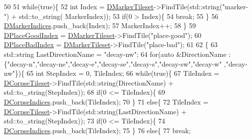 \begin{DoxyCode}
50     
51     \textcolor{keywordflow}{while}(\textcolor{keyword}{true})\{
52         \textcolor{keywordtype}{int} Index = \hyperlink{classCAssetRenderer_afc1e190959f7fd837d6aeb5858cca059}{DMarkerTileset}->FindTile(std::string(\textcolor{stringliteral}{"marker-"}) + std::to\_string(
      MarkerIndex));
53         \textcolor{keywordflow}{if}(0 > Index)\{
54             \textcolor{keywordflow}{break};   
55         \}
56         \hyperlink{classCAssetRenderer_a912a2f38f04bc2e5347f972f8f0caa56}{DMarkerIndices}.push\_back(Index);
57         MarkerIndex++;
58     \}
59     \hyperlink{classCAssetRenderer_a2bf69fa52909e0daccd3b3afc8c79119}{DPlaceGoodIndex} = \hyperlink{classCAssetRenderer_afc1e190959f7fd837d6aeb5858cca059}{DMarkerTileset}->FindTile(\textcolor{stringliteral}{"place-good"});
60     \hyperlink{classCAssetRenderer_a765462ccdeccb81926f565e5d403ed6d}{DPlaceBadIndex} = \hyperlink{classCAssetRenderer_afc1e190959f7fd837d6aeb5858cca059}{DMarkerTileset}->FindTile(\textcolor{stringliteral}{"place-bad"});
61         
62     \{
63         std::string LastDirectionName = \textcolor{stringliteral}{"decay-nw"};
64         \textcolor{keywordflow}{for}(\textcolor{keyword}{auto} &DirectionName : \{\textcolor{stringliteral}{"decay-n"},\textcolor{stringliteral}{"decay-ne"},\textcolor{stringliteral}{"decay-e"},\textcolor{stringliteral}{"decay-se"},\textcolor{stringliteral}{"decay-s"},\textcolor{stringliteral}{"decay-sw"},\textcolor{stringliteral}{"decay-w"}
      ,\textcolor{stringliteral}{"decay-nw"}\})\{
65             \textcolor{keywordtype}{int} StepIndex = 0, TileIndex;
66             \textcolor{keywordflow}{while}(\textcolor{keyword}{true})\{
67                 TileIndex = \hyperlink{classCAssetRenderer_ab7e40b5fdcb49045250e0467d6318567}{DCorpseTileset}->FindTile(std::string(DirectionName) + 
      std::to\_string(StepIndex));
68                 \textcolor{keywordflow}{if}(0 <= TileIndex)\{
69                     \hyperlink{classCAssetRenderer_a572091e74ab9acfa21d2c7c55a966886}{DCorpseIndices}.push\_back(TileIndex);
70                 \}
71                 \textcolor{keywordflow}{else}\{
72                     TileIndex = \hyperlink{classCAssetRenderer_ab7e40b5fdcb49045250e0467d6318567}{DCorpseTileset}->FindTile(std::string(LastDirectionName) + 
      std::to\_string(StepIndex));
73                     \textcolor{keywordflow}{if}(0 <= TileIndex)\{
74                         \hyperlink{classCAssetRenderer_a572091e74ab9acfa21d2c7c55a966886}{DCorpseIndices}.push\_back(TileIndex);
75                     \}
76                     \textcolor{keywordflow}{else}\{
77                         \textcolor{keywordflow}{break};   

\end{DoxyCode}
